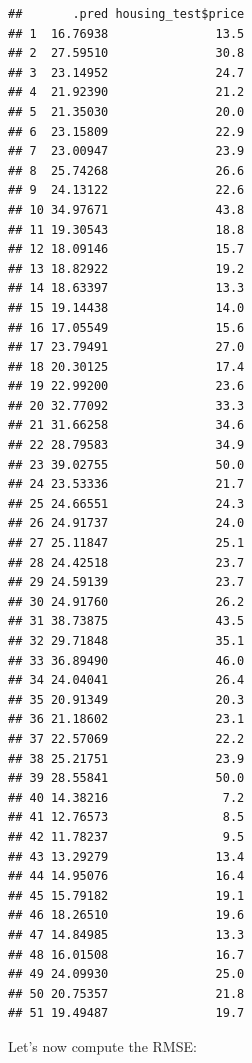 \documentclass[
]{article}
\newenvironment{Shaded}{\begin{snugshade}}{\end{snugshade}}
\newcommand{\FunctionTok}[1]{\textcolor[rgb]{0.00,0.00,0.00}{#1}}
\newcommand{\NormalTok}[1]{#1}
\newcommand{\OtherTok}[1]{\textcolor[rgb]{0.56,0.35,0.01}{#1}}
\newcommand{\SpecialCharTok}[1]{\textcolor[rgb]{0.00,0.00,0.00}{#1}}
\newcommand{\StringTok}[1]{\textcolor[rgb]{0.31,0.60,0.02}{#1}}
\begin{document}
\begin{verbatim}
##       .pred housing_test$price
## 1  16.76938               13.5
## 2  27.59510               30.8
## 3  23.14952               24.7
## 4  21.92390               21.2
## 5  21.35030               20.0
## 6  23.15809               22.9
## 7  23.00947               23.9
## 8  25.74268               26.6
## 9  24.13122               22.6
## 10 34.97671               43.8
## 11 19.30543               18.8
## 12 18.09146               15.7
## 13 18.82922               19.2
## 14 18.63397               13.3
## 15 19.14438               14.0
## 16 17.05549               15.6
## 17 23.79491               27.0
## 18 20.30125               17.4
## 19 22.99200               23.6
## 20 32.77092               33.3
## 21 31.66258               34.6
## 22 28.79583               34.9
## 23 39.02755               50.0
## 24 23.53336               21.7
## 25 24.66551               24.3
## 26 24.91737               24.0
## 27 25.11847               25.1
## 28 24.42518               23.7
## 29 24.59139               23.7
## 30 24.91760               26.2
## 31 38.73875               43.5
## 32 29.71848               35.1
## 33 36.89490               46.0
## 34 24.04041               26.4
## 35 20.91349               20.3
## 36 21.18602               23.1
## 37 22.57069               22.2
## 38 25.21751               23.9
## 39 28.55841               50.0
## 40 14.38216                7.2
## 41 12.76573                8.5
## 42 11.78237                9.5
## 43 13.29279               13.4
## 44 14.95076               16.4
## 45 15.79182               19.1
## 46 18.26510               19.6
## 47 14.84985               13.3
## 48 16.01508               16.7
## 49 24.09930               25.0
## 50 20.75357               21.8
## 51 19.49487               19.7
\end{verbatim}

Let's now compute the RMSE:

\begin{Shaded}
\end{Shaded}
\end{document}
